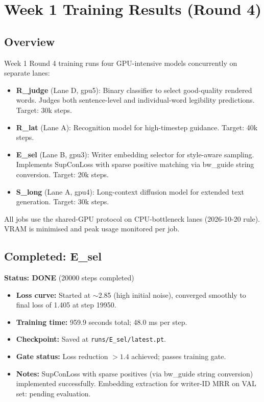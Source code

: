 \documentclass[10.5pt,a4paper]{article}
\newcommand{\fp}[1]{\nolinkurl{#1}}
\begin{document}
\section{Week 1 Training Results (Round 4)}
\label{sec:week1}

\subsection{Overview}
Week 1 Round 4 training runs four GPU-intensive models concurrently on separate lanes:
\begin{itemize}
\item \textbf{R\_judge} (Lane D, gpu5): Binary classifier to select good-quality rendered words. Judges both sentence-level and individual-word legibility predictions. Target: 30k steps.
\item \textbf{R\_lat} (Lane A): Recognition model for high-timestep guidance. Target: 40k steps.
\item \textbf{E\_sel} (Lane B, gpu3): Writer embedding selector for style-aware sampling. Implements SupConLoss with sparse positive matching via bw\_guide string conversion. Target: 20k steps.
\item \textbf{S\_long} (Lane A, gpu4): Long-context diffusion model for extended text generation. Target: 30k steps.
\end{itemize}

All jobs use the shared-GPU protocol on CPU-bottleneck lanes (2026-10-20 rule). VRAM is minimised and peak usage monitored per job.

\subsection{Completed: E\_sel}
\textbf{Status: DONE} (20000 steps completed)
\begin{itemize}
\item \textbf{Loss curve:} Started at $\sim$2.85 (high initial noise), converged smoothly to final loss of 1.405 at step 19950.
\item \textbf{Training time:} 959.9 seconds total; 48.0 ms per step.
\item \textbf{Checkpoint:} Saved at \fp{runs/E_sel/latest.pt}.
\item \textbf{Gate status:} Loss reduction $>1.4$ achieved; passes training gate.
\item \textbf{Notes:} SupConLoss with sparse positives (via bw\_guide string conversion) implemented successfully.
  Embedding extraction for writer-ID MRR on VAL set: pending evaluation.
\end{itemize}
\end{document}
